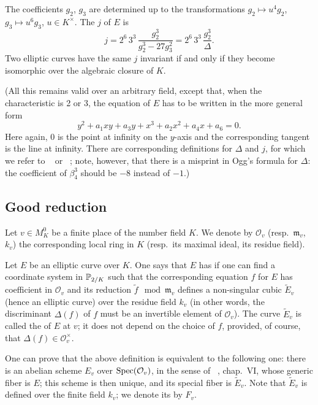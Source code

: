 The coefficients $g_2$, $g_3$ are determined up to the transformations $g_2
\mapsto u^4 g_2$, $g_3 \mapsto u^6 g_3$, $u \in K^\times$. The  $j$
of $E$ is
\[
	j = 2^6 \, 3^3 \, \frac{g_2^3}{g_2^3 - 27g_3^2}
	= 2^6 \, 3^3 \, \frac{g_2^3}{\Delta}.
\]
\dpage
Two elliptic curves have the same $j$ invariant if and only if they become
isomorphic over the algebraic closure of $K$.

(All this remains valid over an arbitrary field, except that, when the
characteristic is 2 or 3, the equation of $E$ has to be written in the more
general form
\[
	y^2 + a_1xy + a_3y + x^3 + a_2x^2 + a_4x + a_6 = 0.
\]
Here again, 0 is the point at infinity on the $y$-axis and the 
corresponding tangent is the line at infinity. There are corresponding
definitions for $\Delta$ and $j$, for which we refer to \citeauthor{9}~\cite{9}
or \citeauthor{20}~\cite{20}; note, however, that there is a misprint in Ogg's
formula for $\Delta$: the coefficient of $\beta_4^3$ should be $-8$ instead of
$-1$.)

\subsection{Good reduction}
\label{sec:IV_12}
Let $v \in M_K^0$ be a finite place of the number field $K$. We denote by
$\mathcal{O}_v$ (resp.\ $\mathfrak{m}_v$, $k_v$) the corresponding local ring
in $K$ (resp.\ its maximal ideal, its residue field).

Let $E$ be an elliptic curve over $K$. One says that $E$ has 
if one can find a coordinate system in $\mathbb{P}_{2/K}$ such that the corresponding
equation $f$ for $E$ has coefficient in $\mathcal{O}_v$ and its reduction
$\tilde f \mod{\mathfrak{m}_v}$ defines a non-singular cubic $\widetilde{E}_v$
(hence an elliptic curve) over the residue field $k_v$ (in other words, the
discriminant $\Delta(f)$ of $f$ must be an invertible element of
$\mathcal{O}_v$).
The curve $\widetilde{E}_v$ is called the  of $E$ at $v$;
\dpage
it does not depend on the choice of $f$, provided, of course, that $\Delta(f) \in
\mathcal{O}_v^\times$.

One can prove that the above definition is equivalent to the following one:
there is an abelian scheme $E_v$ over $\operatorname{Spec}(\mathcal{O}_v)$, in the sense of
\citeauthor{19}~\cite{19}, chap.\ VI, whose generic fiber is $E$; this scheme
is then unique, and its special fiber is $\widetilde{E}_v$. Note that
$\widetilde{E}_v$ is defined over the finite field $k_v$; we denote its
 by $F_v$.

